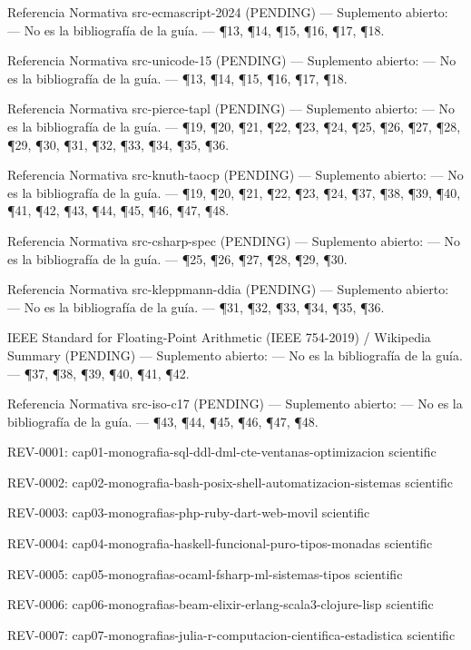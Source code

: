 \documentclass{book}
\begin{document}
\noindent Referencia Normativa src-ecmascript-2024 (PENDING) --- Suplemento abierto: --- No es la bibliografía de la guía. --- \P13, \P14, \P15, \P16, \P17, \P18.

\noindent Referencia Normativa src-unicode-15 (PENDING) --- Suplemento abierto: --- No es la bibliografía de la guía. --- \P13, \P14, \P15, \P16, \P17, \P18.

\noindent Referencia Normativa src-pierce-tapl (PENDING) --- Suplemento abierto: --- No es la bibliografía de la guía. --- \P19, \P20, \P21, \P22, \P23, \P24, \P25, \P26, \P27, \P28, \P29, \P30, \P31, \P32, \P33, \P34, \P35, \P36.

\noindent Referencia Normativa src-knuth-taocp (PENDING) --- Suplemento abierto: --- No es la bibliografía de la guía. --- \P19, \P20, \P21, \P22, \P23, \P24, \P37, \P38, \P39, \P40, \P41, \P42, \P43, \P44, \P45, \P46, \P47, \P48.

\noindent Referencia Normativa src-csharp-spec (PENDING) --- Suplemento abierto: --- No es la bibliografía de la guía. --- \P25, \P26, \P27, \P28, \P29, \P30.

\noindent Referencia Normativa src-kleppmann-ddia (PENDING) --- Suplemento abierto: --- No es la bibliografía de la guía. --- \P31, \P32, \P33, \P34, \P35, \P36.

\noindent IEEE Standard for Floating-Point Arithmetic (IEEE 754-2019) / Wikipedia Summary (PENDING) --- Suplemento abierto: --- No es la bibliografía de la guía. --- \P37, \P38, \P39, \P40, \P41, \P42.

\noindent Referencia Normativa src-iso-c17 (PENDING) --- Suplemento abierto: --- No es la bibliografía de la guía. --- \P43, \P44, \P45, \P46, \P47, \P48.

\noindent REV-0001: cap01-monografia-sql-ddl-dml-cte-ventanas-optimizacion scientific

\noindent REV-0002: cap02-monografia-bash-posix-shell-automatizacion-sistemas scientific

\noindent REV-0003: cap03-monografias-php-ruby-dart-web-movil scientific

\noindent REV-0004: cap04-monografia-haskell-funcional-puro-tipos-monadas scientific

\noindent REV-0005: cap05-monografias-ocaml-fsharp-ml-sistemas-tipos scientific

\noindent REV-0006: cap06-monografias-beam-elixir-erlang-scala3-clojure-lisp scientific

\noindent REV-0007: cap07-monografias-julia-r-computacion-cientifica-estadistica scientific
\end{document}
